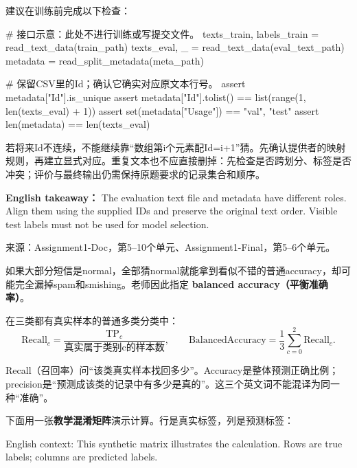 建议在训练前完成以下检查：



\begin{StudyCode}
# 接口示意：此处不进行训练或写提交文件。
texts_train, labels_train = read_text_data(train_path)
texts_eval, _ = read_text_data(eval_text_path)
metadata = read_split_metadata(meta_path)

# 保留CSV里的Id；确认它确实对应原文本行号。
assert metadata["Id"].is_unique
assert metadata["Id"].tolist() == list(range(1, len(texts_eval) + 1))
assert set(metadata["Usage"]) == {"val", "test"}
assert len(metadata) == len(texts_eval)
\end{StudyCode}


若将来Id不连续，不能继续靠“数组第i个元素配Id=i+1”猜。先确认提供者的映射规则，再建立显式对应。重复文本也不应直接删掉：先检查是否跨划分、标签是否冲突；评价与最终输出仍需保持原题要求的记录集合和顺序。


\textbf{English takeaway：} The evaluation text file and metadata have different roles. Align them using the supplied IDs and preserve the original text order. Visible test labels must not be used for model selection.


来源：Assignment1-Doc，第5–10个单元、Assignment1-Final，第5–6个单元。








如果大部分短信是normal，全部猜normal就能拿到看似不错的普通accuracy，却可能完全漏掉spam和smishing。老师因此指定 \textbf{balanced accuracy（平衡准确率）}。


在三类都有真实样本的普通多类分类中：
\[
\mathrm{Recall}_c=\frac{\mathrm{TP}_c}{\text{真实属于类别c的样本数}},
\qquad
\mathrm{BalancedAccuracy}=\frac13\sum_{c=0}^{2}\mathrm{Recall}_c.\tag{A1.1}
\]


Recall（召回率）问“该类真实样本找回多少”。Accuracy是整体预测正确比例；precision是“预测成该类的记录中有多少是真的”。这三个英文词不能混译为同一种“准确”。





下面用一张\textbf{教学混淆矩阵}演示计算。行是真实标签，列是预测标签：


English context: This synthetic matrix illustrates the calculation. Rows are true labels; columns are predicted labels.


